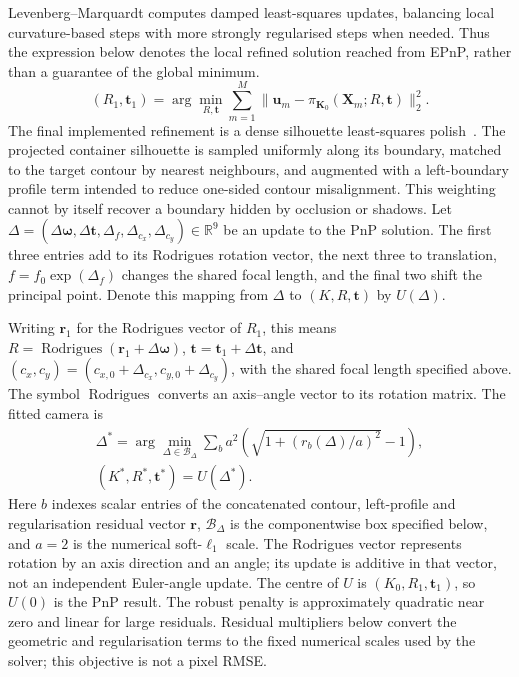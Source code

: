 Levenberg--Marquardt computes damped least-squares updates, balancing
local curvature-based steps with more strongly regularised steps
when needed. Thus the expression below denotes the local refined
solution reached from EPnP, rather than a guarantee of the global
minimum.
\begin{equation}
\label{eq:pnp-lm}
    (R_1,\mathbf{t}_1)
    =
    \arg\min_{R,\mathbf{t}}
    \sum_{m=1}^{M}
    \|\mathbf{u}_m-\pi_{\mathbf{K}_0}(\mathbf{X}_m;R,\mathbf{t})\|_2^2 .
\end{equation}
The final implemented refinement is a dense silhouette least-squares
polish~\cite{bates1988nonlinear}. The projected container silhouette is
sampled uniformly along its boundary, matched to the target contour by
nearest neighbours, and augmented with a left-boundary profile term intended to reduce one-sided contour misalignment. This weighting
cannot by itself recover a boundary hidden by occlusion or shadows. Let $\Delta=(\Delta\boldsymbol\omega,\Delta\mathbf t,
\Delta_f,\Delta_{c_x},\Delta_{c_y})\in\mathbb R^9$ be an update to the
PnP solution. The first three entries add to its Rodrigues rotation
vector, the next three to translation, $f=f_0\exp(\Delta_f)$ changes
the shared focal length, and the final two shift the principal point.
Denote this mapping from $\Delta$ to $(K,R,\mathbf t)$ by $U(\Delta)$.

Writing $\mathbf r_1$ for the Rodrigues vector of $R_1$, this means
$R=\operatorname{Rodrigues}(\mathbf r_1+\Delta\boldsymbol\omega)$,
$\mathbf t=\mathbf t_1+\Delta\mathbf t$, and
$(c_x,c_y)=(c_{x,0}+\Delta_{c_x},c_{y,0}+\Delta_{c_y})$,
with the shared focal length specified above. The symbol
$\operatorname{Rodrigues}$ converts an axis--angle vector to its
rotation matrix.
The fitted camera is
\begin{equation}
\label{eq:dense-refine}
\begin{aligned}
 \Delta^*=\arg\min_{\Delta\in\mathcal B_\Delta}
 \sum_b a^2\left(\sqrt{1+(r_b(\Delta)/a)^2}-1\right),\\
 (K^*,R^*,\mathbf t^*)=U(\Delta^*).
\end{aligned}
\end{equation}
Here $b$ indexes scalar entries of the concatenated contour,
left-profile and regularisation residual vector $\mathbf r$,
$\mathcal B_\Delta$ is the componentwise box specified below, and
$a=2$ is the numerical soft-$\ell_1$ scale. The Rodrigues vector
represents rotation by an axis direction and an angle; its update is
additive in that vector, not an independent Euler-angle update.
The centre of $U$ is $(K_0,R_1,\mathbf t_1)$, so $U(0)$ is the PnP result. The robust
penalty is approximately quadratic near zero and linear for large
residuals. Residual multipliers below convert the geometric and
regularisation terms to the fixed numerical scales used by the solver;
this objective is not a pixel RMSE.

